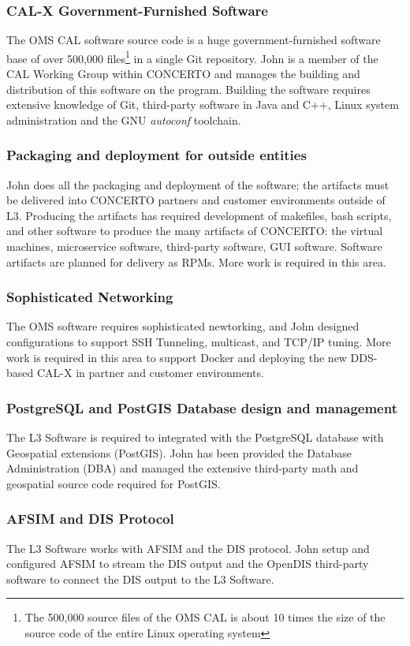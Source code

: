 \documentclass[letterpaper,11pt]{texMemo} %
\begin{document}
\subsubsection*{CAL-X Government-Furnished Software}
The OMS CAL software source code is a huge government-furnished software base of over 500,000 files\footnote{The 500,000 source files of the OMS CAL is about 10 times the size of the source code of the entire Linux operating system} in a single Git repository.  John is a member of the CAL Working Group within CONCERTO and manages the building and distribution of this software on the program.  Building the software requires extensive knowledge of Git, third-party software in Java and C++, Linux system administration and the GNU \emph{autoconf} toolchain.


\subsubsection*{Packaging and deployment for outside entities}
John does all the packaging and deployment of the software; the artifacts must be delivered into CONCERTO partners and customer environments outside of L3.  Producing the artifacts has required development of makefiles, bash scripts, and other software to produce the many artifacts of CONCERTO: the virtual machines, microservice software, third-party software, GUI software.  Software artifacts are planned for delivery as RPMs.  More work is required in this area.

\subsubsection*{Sophisticated Networking}
The OMS software requires sophisticated newtorking, and John designed configurations to support SSH Tunneling, multicast, and TCP/IP tuning.  More work is required in this area to support Docker and deploying the new DDS-based CAL-X in partner and customer environments.

\subsubsection*{PostgreSQL and PostGIS Database design and management}
The L3 Software is required to integrated with the PostgreSQL database with Geospatial extensions (PostGIS).  John has been provided the Database Administration (DBA) and managed the extensive third-party math and geospatial source code required for PostGIS.

\subsubsection*{AFSIM and DIS Protocol}
The L3 Software works with AFSIM and the DIS protocol.  John setup and configured AFSIM to stream the DIS output and the OpenDIS third-party software to connect the DIS output to the L3 Software.
\end{document}
